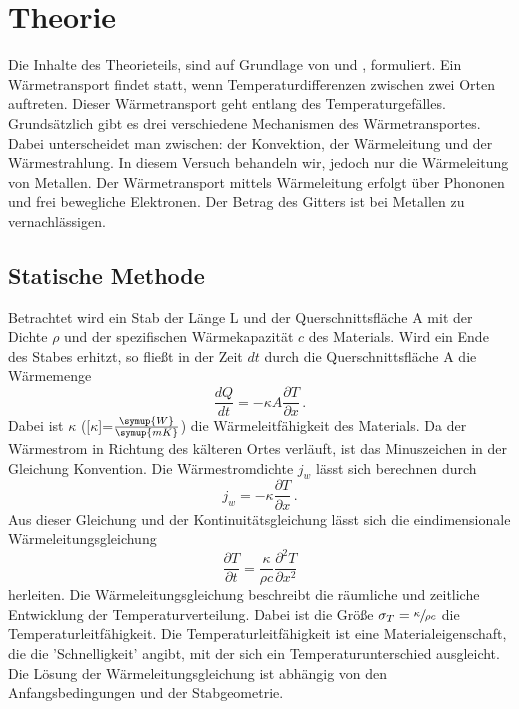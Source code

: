 \section{Theorie}
\label{sec:Theorie}
Die Inhalte des Theorieteils, sind auf Grundlage von \cite{sample} und \cite{demtröder}, formuliert.
Ein Wärmetransport findet statt, wenn Temperaturdifferenzen zwischen zwei Orten auftreten.
Dieser Wärmetransport geht entlang des Temperaturgefälles. Grundsätzlich gibt es drei verschiedene Mechanismen des Wärmetransportes.
Dabei unterscheidet man zwischen: der Konvektion, der Wärmeleitung und der Wärmestrahlung.
In diesem Versuch behandeln wir, jedoch nur die Wärmeleitung von Metallen.
Der Wärmetransport mittels Wärmeleitung erfolgt über Phononen und frei bewegliche Elektronen. Der Betrag des Gitters ist bei Metallen zu vernachlässigen.
\subsection{Statische Methode}
\label{sec:stM}
Betrachtet wird ein Stab der Länge L und der Querschnittsfläche A mit der Dichte $\rho$ und der spezifischen Wärmekapazität $c$ des Materials.
Wird ein Ende des Stabes erhitzt, so fließt in der Zeit $dt$ durch die Querschnittsfläche A die Wärmemenge
\begin{equation}
    \frac{dQ}{dt}=-\kappa A \frac{\partial T}{\partial x} \,.
    \label{eqn:Wärmemenge}
\end{equation}
Dabei ist $\kappa$ ([$\kappa$]=$\frac{\symup{W}}{\symup{m K}}$) die Wärmeleitfähigkeit des Materials. Da der Wärmestrom 
in Richtung des kälteren Ortes verläuft, ist das Minuszeichen in der Gleichung Konvention. Die Wärmestromdichte $j_w$ lässt sich berechnen durch
\begin{equation}
    j_w=-\kappa \frac{\partial T}{\partial x}\,.
    \label{eqn:wärmedichte}
\end{equation}
Aus dieser Gleichung und der Kontinuitätsgleichung lässt sich die eindimensionale Wärmeleitungsgleichung
\begin{equation}
    \frac{\partial T}{\partial t}=\frac{\kappa}{\rho c}\frac{\partial^2 T}{\partial x^2}
    \label{eqn:Wärmeleitungsgleichung}
\end{equation}
herleiten. Die Wärmeleitungsgleichung beschreibt die räumliche und zeitliche Entwicklung der Temperaturverteilung. Dabei ist die Größe $\sigma_T=\sfrac{\kappa}{\rho c}$
die Temperaturleitfähigkeit. Die Temperaturleitfähigkeit ist eine Materialeigenschaft, die die 'Schnelligkeit' angibt, mit der sich ein Temperaturunterschied ausgleicht.
Die Lösung der Wärmeleitungsgleichung ist abhängig von den Anfangsbedingungen und der Stabgeometrie.
